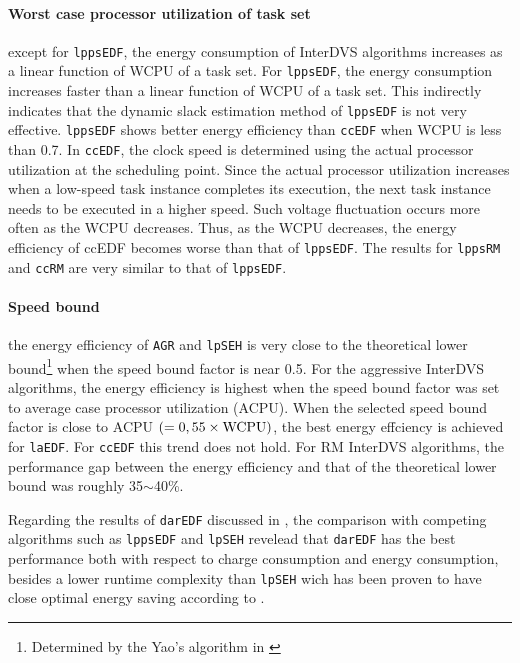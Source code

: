 \documentclass[10pt,article]{IEEEtran}
\begin{document}
\paragraph{Worst case processor utilization of task set} except for \texttt{lppsEDF}, the energy consumption of InterDVS algorithms increases as a linear function of WCPU of a task  set. For \texttt{lppsEDF}, the energy consumption increases faster than a linear function of WCPU of a task set. This indirectly indicates that the dynamic slack estimation method of \texttt{lppsEDF} is not very effective. 
\texttt{lppsEDF} shows better energy efficiency than \texttt{ccEDF} when WCPU is less than 0.7. In \texttt{ccEDF}, the clock speed is determined using the actual processor utilization at the scheduling point.  Since the actual processor utilization increases when a low-speed task instance completes its execution, the next task instance needs to be executed in a higher speed. Such  voltage fluctuation occurs more often as the WCPU decreases. Thus, as the WCPU decreases, the energy efficiency of ccEDF becomes worse than that of \texttt{lppsEDF}. The results for \texttt{lppsRM} and \texttt{ccRM} are very similar to that of \texttt{lppsEDF}. 

\paragraph{Speed bound} the energy efficiency of \texttt{AGR} and \texttt{lpSEH} is very close to the theoretical lower bound\footnote{Determined by the Yao's algorithm in \cite{yao}} when the speed bound factor is near 0.5. For the aggressive InterDVS algorithms, the energy efficiency is highest when the speed bound factor was set to average case processor utilization (ACPU). When the selected speed bound factor is close to ACPU $(= 0,55 \times \textnormal{WCPU})$, the best energy effciency is achieved for \texttt{laEDF}. For \texttt{ccEDF} this trend does not hold. For RM InterDVS algorithms, the performance gap between the energy efficiency and that of the theoretical lower bound was roughly 35$\sim$40\%.

Regarding the results of \texttt{darEDF} discussed in \cite{zhuo-chakrabarti}, the comparison with competing algorithms such as \texttt{lppsEDF} and \texttt{lpSEH} revelead that \texttt{darEDF} has the best performance both with respect to charge consumption and energy consumption, besides a lower runtime complexity than \texttt{lpSEH} wich has been proven to have close optimal energy saving according to \cite{kim-2}.
\end{document}

